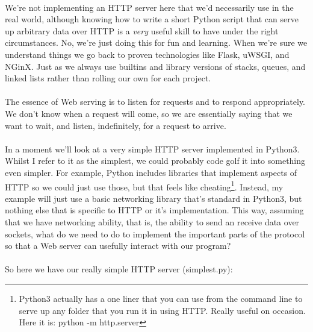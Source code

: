\paragraph{} We're not implementing an HTTP server here that we'd necessarily use in the real world, although knowing how to write a short Python script that can serve up arbitrary data over HTTP is a \emph{very} useful skill to have under the right circumstances. No, we're just doing this for fun and learning. When we're sure we understand things we go back to proven technologies like Flask, uWSGI, and NGinX. Just as we always use builtins and library versions of stacks, queues, and linked lists rather than rolling our own for each project.

\paragraph{} The essence of Web serving is to listen for requests and to respond appropriately. We don't know when a request will come, so we are essentially saying that we want to wait, and listen, indefinitely, for a request to arrive.

\paragraph{} In a moment we'll look at a very simple HTTP server implemented in Python3. Whilst I refer to it as the simplest, we could probably code golf it into something even simpler. For example, Python includes libraries that implement aspects of HTTP so we could just use those, but that feels like cheating\footnote{Python3 actually has a one liner that you can use from the command line to serve up any folder that you run it in using HTTP. Really useful on occasion. Here it is: python -m http.server}. Instead, my example will just use a basic networking library that's standard in Python3, but nothing else that is specific to HTTP or it's implementation. This way, assuming that we have networking ability, that is, the ability to send an receive data over sockets, what do we need to do to implement the important parts of the protocol so that a Web server can usefully interact with our program?

\paragraph{} So here we have our really simple HTTP server (simplest.py):

